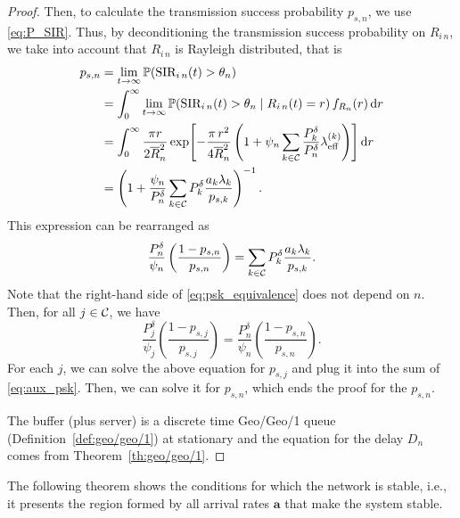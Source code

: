 \begin{proof}
    Then, to calculate the transmission success probability $p_{s,n}$, we use \eqref{eq:P_SIR}. Thus, by deconditioning the transmission success probability on $R_{i\,n}$, we take into account that $R_{i\,n}$ is Rayleigh distributed, that is
    \begin{align} \label{eq:aux_psk}
    	p_{s,n} &= \lim_{t\to\infty}\P(\text{SIR}_{i\,n}(t)>\theta_n) \nonumber\\
        	&= \int_0^\infty \lim_{t\to\infty} \P(\text{SIR}_{i\,n}(t)>\theta_n
            	\mid R_{i\,n}(t) = r)\,f_{R_n}(r)\,\mathrm{d}r \nonumber\\
            &= \int_0^\infty \frac{\pi r}{2 \overline{R}_n^2} \exp\!\left[ - \frac{\pi\,r^2}{4\overline{R}_n^2} \left(1+\psi_n\sum_{k\in\cal{C}}\frac{P_k^\delta}{P_n^\delta}\lambda_\mathrm{eff}^{(k)}\right)\right]\mathrm{d}r \nonumber\\
            &= \left( 1 + \dfrac{\psi_n}{P_n^\delta}
      			\sum_{k\in\cal{C}} P_k^\delta \dfrac{a_k\lambda_k}{p_{s,k}} \right)^{-1}.
    \end{align}
    This expression can be rearranged as
    \begin{equation} \label{eq:psk_equivalence}
    	\dfrac{P_n^\delta}{\psi_n} \left( \dfrac{1-p_{s,n}}{p_{s,n}}\right) = 
        \sum_{k\in\cal{C}} P_k^\delta \dfrac{a_k\lambda_k}{p_{s,k}}.
    \end{equation}
    Note that the right-hand side of \eqref{eq:psk_equivalence} does not depend on $n$. Then, for all $j\in\cal{C}$, we have%
    \begin{equation} \label{eq:Pi_Pk}
    	\dfrac{P_j^\delta}{\psi_j} \left( \dfrac{1-p_{s,j}}{p_{s,j}}\right) = 
        \dfrac{P_n^\delta}{\psi_n} \left( \dfrac{1-p_{s,n}}{p_{s,n}}\right).
    \end{equation}
    For each $j$, we can solve the above equation for $p_{s,j}$ and plug it into the sum of \eqref{eq:aux_psk}. Then, we can solve it for $p_{s,n}$, which ends the proof for the $p_{s,n}$.
    
    The buffer (plus server) is a discrete time Geo/Geo/1 queue (Definition~\ref{def:geo/geo/1}) at stationary \cite{stamatiou2010random} and the equation for the delay $D_n$ comes from Theorem~\ref{th:geo/geo/1}.
\end{proof}

The following theorem shows the conditions for which the network is stable, i.e., it presents the region formed by all arrival rates $\bm{a}$ that make the system stable.

